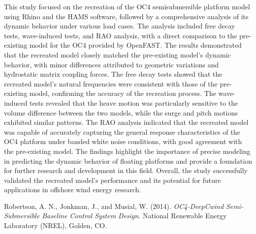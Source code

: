 \documentclass[a4paper, 11pt]{article}
\begin{document}
\hspace*{0.5cm}This study focused on the recreation of the OC4 semisubmersible platform model using Rhino and the HAMS software, followed by a comprehensive analysis of its dynamic behavior under various load cases. The analysis included free decay tests, wave-induced tests, and RAO analysis, with a direct comparison to the pre-existing model for the OC4 provided by OpenFAST. The results demonstrated that the recreated model closely matched the pre-existing model's dynamic behavior, with minor differences attributed to geometric variations and hydrostatic matrix coupling forces. The free decay tests showed that the recreated model's natural frequencies were consistent with those of the pre-existing model, confirming the accuracy of the recreation process. The wave-induced tests revealed that the heave motion was particularly sensitive to the volume difference between the two models, while the surge and pitch motions exhibited similar patterns. The RAO analysis indicated that the recreated model was capable of accurately capturing the general response characteristics of the OC4 platform under banded white noise conditions, with good agreement with the pre-existing model. The findings highlight the importance of precise modeling in predicting the dynamic behavior of floating platforms and provide a foundation for further research and development in this field. Overall, the study successfully validated the recreated model's performance and its potential for future applications in offshore wind energy research.

\newpage
\begin{thebibliography}{99} %

 Robertson, A. N., Jonkman, J., and Musial, W. (2014). \textit{OC4-DeepCwind Semi-Submersible Baseline Control System Design}. National Renewable Energy Laboratory (NREL), Golden, CO.

\end{thebibliography}
\end{document}
